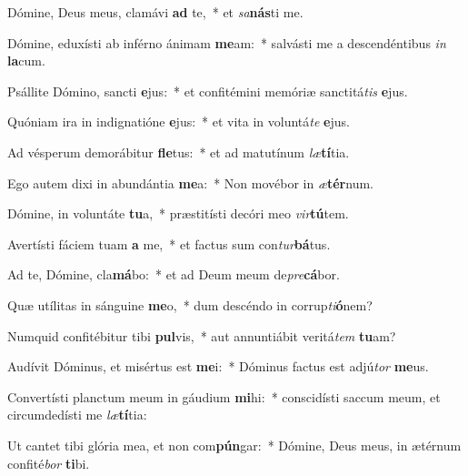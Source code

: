 \item Dómine, Deus meus, clamávi \textbf{ad} te,~* et \textit{sa}\textbf{nás}ti me.
\item Dómine, eduxísti ab inférno ánimam \textbf{me}am:~* salvásti me a descendéntibus \textit{in} \textbf{la}cum.
\item Psállite Dómino, sancti \textbf{e}jus:~* et confitémini memóriæ sanctitá\textit{tis} \textbf{e}jus.
\item Quóniam ira in indignatióne \textbf{e}jus:~* et vita in voluntá\textit{te} \textbf{e}jus.
\item Ad vésperum demorábitur \textbf{fle}tus:~* et ad matutínum \textit{læ}\textbf{tí}tia.
\item Ego autem dixi in abundántia \textbf{me}a:~* Non movébor in \textit{æ}\textbf{tér}num.
\item Dómine, in voluntáte \textbf{tu}a,~* præstitísti decóri meo \textit{vir}\textbf{tú}tem.
\item Avertísti fáciem tuam \textbf{a} me,~* et factus sum con\textit{tur}\textbf{bá}tus.
\item Ad te, Dómine, cla\textbf{má}bo:~* et ad Deum meum de\textit{pre}\textbf{cá}bor.
\item Quæ utílitas in sánguine \textbf{me}o,~* dum descéndo in corrup\textit{ti}\textbf{ó}nem?
\item Numquid confitébitur tibi \textbf{pul}vis,~* aut annuntiábit veritá\textit{tem} \textbf{tu}am?
\item Audívit Dóminus, et misértus est \textbf{me}i:~* Dóminus factus est adjú\textit{tor} \textbf{me}us.
\item Convertísti planctum meum in gáudium \textbf{mi}hi:~* conscidísti saccum meum, et circumdedísti me \textit{læ}\textbf{tí}tia:
\item Ut cantet tibi glória mea, et non com\textbf{pún}gar:~* Dómine, Deus meus, in ætérnum confité\textit{bor} \textbf{ti}bi.
